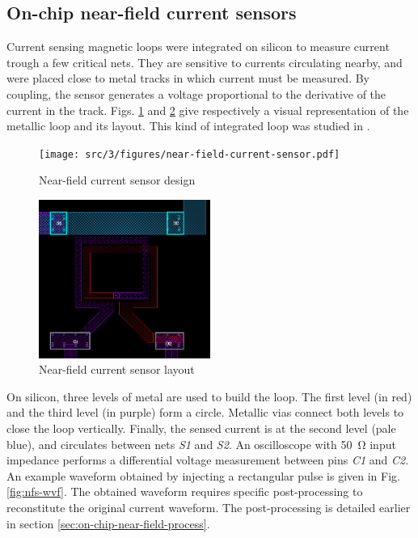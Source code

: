 \subsection{On-chip near-field current sensors}

Current sensing magnetic loops were integrated on silicon to measure current trough a few critical nets.
They are sensitive to currents circulating nearby, and were placed close to metal tracks in which current must be measured.
By coupling, the sensor generates a voltage proportional to the derivative of the current in the track.
Figs. \ref{fig:near-field-current-sensor} and \ref{fig:near-field-current-sensor-layout} give respectively a visual representation of the metallic loop and its layout.
This kind of integrated loop was studied in \cite{OtherInductors, InductorsLAAS1, InductorsLAAS2, AlainSallesInductors}.

\begin{figure}[!h]
  \centering
  \texttt{[image: src/3/figures/near-field-current-sensor.pdf]}
  \caption{Near-field current sensor design}
  \label{fig:near-field-current-sensor}
\end{figure}

\begin{figure}[!h]
  \centering
  \includegraphics[width=0.5\textwidth]{src/3/figures/sensor_layout.png}
  \caption{Near-field current sensor layout}
  \label{fig:near-field-current-sensor-layout}
\end{figure}

On silicon, three levels of metal are used to build the loop.
The first level (in red) and the third level (in purple) form a circle.
Metallic vias connect both levels to close the loop vertically.
Finally, the sensed current is at the second level (pale blue), and circulates between nets \textit{S1} and \textit{S2}.
An oscilloscope with \SI{50}{\ohm} input impedance performs a differential voltage measurement between pins \textit{C1} and \textit{C2}.
An example waveform obtained by injecting a rectangular pulse is given in Fig. \ref{fig:nfs-wvf}.
The obtained waveform requires specific post-processing to reconstitute the original current waveform.
The post-processing is detailed earlier in section \ref{sec:on-chip-near-field-process}.

